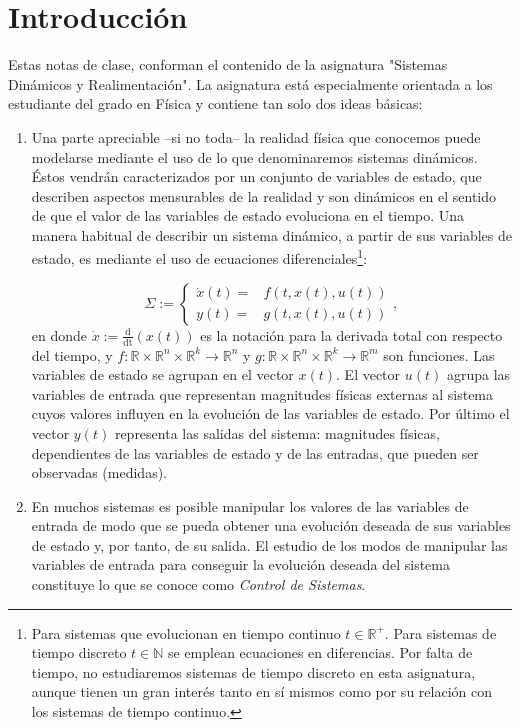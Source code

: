\chapter{Introducción}
Estas notas de clase, conforman el contenido de la asignatura "Sistemas Dinámicos y Realimentación". La asignatura está especialmente orientada  a los estudiante del grado en Física y contiene tan solo dos ideas básicas:

\begin{enumerate}
\item Una parte apreciable --si no toda-- la realidad física que conocemos puede modelarse mediante el uso de lo que denominaremos sistemas dinámicos. Éstos vendrán caracterizados por un conjunto de variables de estado, que describen aspectos mensurables de la realidad y son dinámicos en el sentido de que el valor de las variables de estado evoluciona en el tiempo. Una manera habitual de describir un sistema dinámico, a partir de sus variables de estado, es mediante el uso de ecuaciones diferenciales\footnote{Para sistemas que evolucionan en tiempo continuo $t\in \mathbb{R}^+$. Para sistemas de tiempo discreto $t \in \mathbb{N}$ se emplean ecuaciones en diferencias. Por falta de tiempo, no estudiaremos sistemas de tiempo discreto en esta asignatura, aunque tienen un gran interés tanto en sí mismos como por su relación con los sistemas de tiempo continuo.}:

\begin{equation}
	\Sigma := \begin{cases}
		\dot x(t) =& f(t,x(t),u(t)) \\ y(t) =& g(t,x(t),u(t))
	\end{cases}, 
\label{eq: sigma}
\end{equation}
en donde $\dot x := \frac{\mathrm{d}}{\mathrm{dt}}(x(t))$ es la notación para la derivada total con respecto del tiempo, y $f:\mathbb{R} \times \mathbb{R}^n \times \mathbb{R}^k \to \mathbb{R}^n$ y $g: \mathbb{R} \times \mathbb{R}^n \times \mathbb{R}^k \to \mathbb{R}^m$ son funciones. Las variables de estado se agrupan en el vector $x(t)$.  El vector $u(t)$ agrupa las variables de entrada que representan magnitudes físicas externas al sistema cuyos valores influyen en la evolución de las variables de estado. Por último el vector $y(t)$ representa las salidas del sistema: magnitudes físicas, dependientes de las variables de estado y de las entradas, que pueden ser observadas (medidas). 

\item En muchos sistemas es posible manipular los valores de las variables de entrada de modo que se pueda obtener una evolución deseada de sus variables de estado y, por tanto, de su salida. El estudio de los modos de manipular las variables de entrada para conseguir la evolución deseada del sistema constituye lo que se conoce como \emph{Control de Sistemas}.


\end{enumerate}
